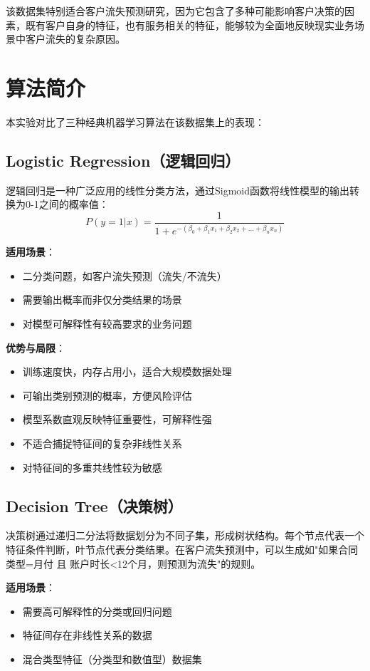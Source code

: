 \documentclass[12pt,a4paper]{article}
\begin{document}
该数据集特别适合客户流失预测研究，因为它包含了多种可能影响客户决策的因素，既有客户自身的特征，也有服务相关的特征，能够较为全面地反映现实业务场景中客户流失的复杂原因。

\section{算法简介}
本实验对比了三种经典机器学习算法在该数据集上的表现：

\subsection{Logistic Regression（逻辑回归）}
逻辑回归是一种广泛应用的线性分类方法，通过Sigmoid函数将线性模型的输出转换为0-1之间的概率值：
\begin{equation}
P(y=1|x) = \frac{1}{1 + e^{-(\beta_0 + \beta_1 x_1 + \beta_2 x_2 + ... + \beta_n x_n)}}
\end{equation}

\textbf{适用场景}：
\begin{itemize}
    \item 二分类问题，如客户流失预测（流失/不流失）
    \item 需要输出概率而非仅分类结果的场景
    \item 对模型可解释性有较高要求的业务问题
\end{itemize}

\textbf{优势与局限}：
\begin{itemize}
    \item 训练速度快，内存占用小，适合大规模数据处理
    \item 可输出类别预测的概率，方便风险评估
    \item 模型系数直观反映特征重要性，可解释性强
    \item 不适合捕捉特征间的复杂非线性关系
    \item 对特征间的多重共线性较为敏感
\end{itemize}

\subsection{Decision Tree（决策树）}
决策树通过递归二分法将数据划分为不同子集，形成树状结构。每个节点代表一个特征条件判断，叶节点代表分类结果。在客户流失预测中，可以生成如"如果合同类型=月付 且 账户时长<12个月，则预测为流失"的规则。

\textbf{适用场景}：
\begin{itemize}
    \item 需要高可解释性的分类或回归问题
    \item 特征间存在非线性关系的数据
    \item 混合类型特征（分类型和数值型）数据集
\end{itemize}
\end{document}
